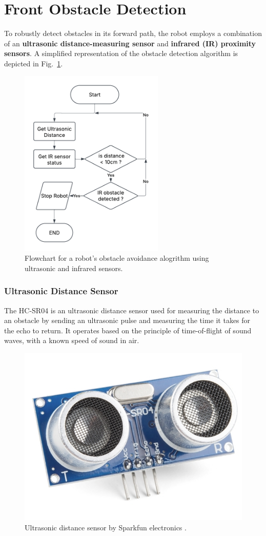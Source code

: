 
\section{Front Obstacle Detection}
To robustly detect obstacles in its forward path, the robot employs a combination of an \textbf{ultrasonic distance-measuring sensor} and \textbf{infrared (IR) proximity sensors}. A simplified representation of the obstacle detection algorithm is depicted in Fig.~\ref{fig:obstacle_diagram}.

\begin{figure} [H]
	\centering
	\includegraphics[height=9cm]{assets/obstacle_diagram}
	\caption{Flowchart for a robot's obstacle avoidance alogrithm using ultrasonic and infrared sensors.}
	\label{fig:obstacle_diagram}
\end{figure}


\subsubsection{Ultrasonic Distance Sensor} \label{HC-SR04}
The HC-SR04 is an ultrasonic distance sensor used for measuring the distance to an obstacle by sending an ultrasonic pulse and measuring the time it takes for the echo to return. It operates based on the principle of time-of-flight of sound waves, with a known speed of sound in air.
\begin{figure}[H]
	\centering
	\includegraphics[width=0.25\linewidth]{assets/Ultrasonic-HC-SR04.png}
	\caption{Ultrasonic distance sensor by  Sparkfun electronics \cite{ultrasonic_sensor}.}
	\label{fig:ultra-sonic}
\end{figure}


